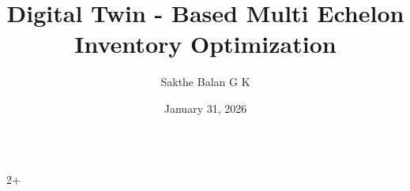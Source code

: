 \documentclass[final]{beamer}
\title{Digital Twin - Based Multi Echelon Inventory Optimization}%
\author{Sakthe Balan G K}
\institute[shortinst]{Indian Institute of Technology, Madras, India}
\date{January 31, 2026}
\newlength{\sepwidth}
\newlength{\colwidth}
\begin{document}
	
\begin{frame}[t]
	
	\begin{columns}[t]
	
	\begin{column}{2\colwidth+\sepwidth}
	\vspace{-3em}






\end{column}
\end{columns}
\end{frame}
\end{document}
